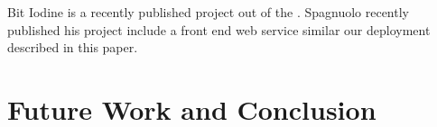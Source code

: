 \documentclass[10pt, letterpaper, twocolumn, twoside]{article}
\begin{document}
Bit Iodine is a recently published project out of the . Spagnuolo recently published his project include a front end web service similar our deployment described in this paper.


\section{Future Work and Conclusion}




\end{document}
